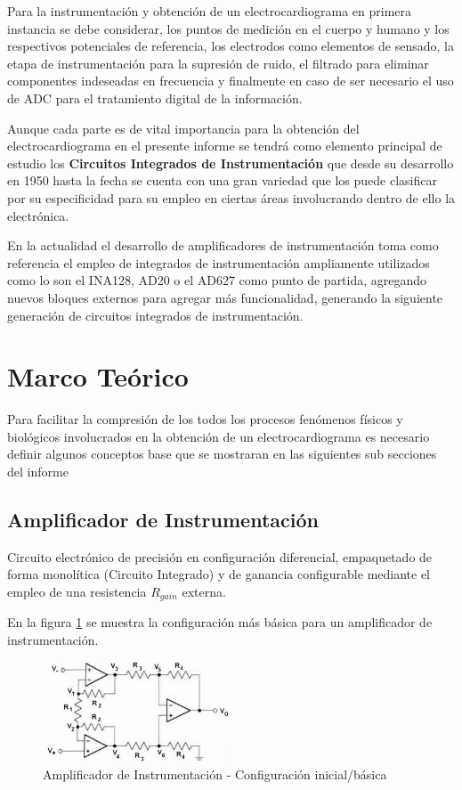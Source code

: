 \documentclass[conference]{IEEEtran}
\begin{document}
	Para la instrumentación y obtención de un electrocardiograma en primera instancia se debe considerar, los puntos de medición en el cuerpo y humano y los respectivos potenciales de referencia, los electrodos como elementos de sensado, la etapa de instrumentación para la supresión de ruido, el filtrado para eliminar componentes indeseadas en frecuencia y finalmente en caso de ser necesario el uso de ADC para el tratamiento digital de la información.
	
	Aunque cada parte es de vital importancia para la obtención del electrocardiograma en el presente informe se tendrá como elemento principal de estudio los \textbf{Circuitos Integrados de Instrumentación} que desde su desarrollo en 1950 hasta la fecha se cuenta con una gran variedad que los puede clasificar por su especificidad para su empleo en ciertas áreas involucrando dentro de ello la electrónica.
	
	En la actualidad el desarrollo de amplificadores de instrumentación toma como referencia el empleo de integrados de instrumentación ampliamente utilizados como lo son el INA128, AD20 o el AD627 como punto de partida, agregando nuevos bloques externos para agregar más funcionalidad, generando la siguiente generación de circuitos integrados de instrumentación.
	
	\section{Marco Teórico}
	
	Para facilitar la compresión de los todos los procesos fenómenos físicos y biológicos involucrados en la obtención de un electrocardiograma es necesario definir algunos conceptos base que se mostraran en las siguientes sub secciones del informe
	
	\subsection{Amplificador de Instrumentación}
	Circuito electrónico de precisión en configuración diferencial, empaquetado de forma monolítica (Circuito Integrado) y de ganancia configurable mediante el empleo de una resistencia $R_{gain}$ externa.
	
	En la figura \ref{fig:amplificador-instrumentacion} se muestra la configuración más básica para un amplificador de instrumentación.
	\begin{figure}[h]
		\centering
		\includegraphics[width=0.5\textwidth]{media/amplificador-instrumentacion}
		\caption{Amplificador de Instrumentación - Configuración inicial/básica}
		\label{fig:amplificador-instrumentacion}
	\end{figure}
	
\end{document}
